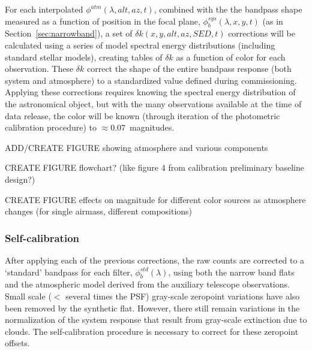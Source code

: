\documentclass[12pt,preprint]{aastex}
\begin{document}
For each interpolated $\phi^{atm}(\lambda,alt,az,t)$, combined with
the the bandpass shape measured as a function of position in the focal
plane, $\phi_b^{sys}(\lambda,x,y,t)$ (as in Section~\ref{sec:narrowband}), a set of $\delta
k(x,y,alt,az,SED,t)$ corrections will be calculated using a series of model
spectral energy distributions (including standard
stellar models), creating tables of $\delta k$ as a
function of color for each observation. These $\delta k$ correct the shape of the entire
bandpass response (both system and atmosphere) to a standardized value
defined during commissioning. Applying these corrections requires knowing
the spectral energy distribution of the astronomical object, but with
the many observations available at the time of data release, the color
will be known (through iteration of the photometric calibration
procedure) to $\approx 0.07$~magnitudes.

ADD/CREATE FIGURE showing atmosphere and various components

CREATE FIGURE flowchart? (like figure 4 from calibration preliminary
baseline design?)

CREATE FIGURE effects on magnitude for different color sources as
atmosphere changes (for single airmass, different compositions)

\subsubsection{Self-calibration}
\label{sec:selfcalib}

After applying each of the previous corrections, the raw counts are
corrected to a `standard' bandpass for each filter,
$\phi_b^{std}(\lambda)$, using both the narrow band flats and the
atmospheric model derived from the auxiliary telescope
observations. Small scale ($<$ several times the PSF) gray-scale
zeropoint variations have also been removed by the synthetic
flat. However, there still remain variations in the normalization of the
system response that result from gray-scale extinction due to
clouds. The self-calibration procedure is necessary to correct for
these zeropoint offsets.
\end{document}
